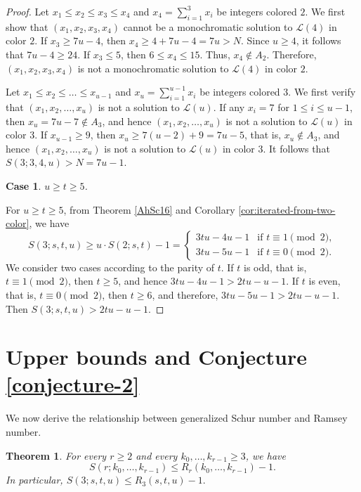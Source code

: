 \documentclass[twoside, 12pt]{article}
\newtheorem{theorem}{Theorem}
\newtheorem{case}{Case}
\begin{document}
\begin{proof}
Let \(x_1 \leq x_2 \leq x_3 \leq x_4\) and $x_4=\sum_{i=1}^3 x_i$ be integers colored \(2\). We first show that \((x_1,x_2,x_3,x_4)\) cannot be a monochromatic solution to \(\mathcal{L}(4)\) in color \(2\). If $x_3 \geq 7u-4$, then $x_4 \geq 4+7u-4=7u >N$.
Since $u \geq 4$, it follows that $7u-4 \geq 24$. If $x_3 \leq 5$, then $ 6 \leq x_4 \leq 15$. Thus, $x_4 \notin A_2$. Therefore, \((x_1,x_2,x_3,x_4)\) is not a monochromatic solution to \(\mathcal{L}(4)\) in color \(2\).


Let \(x_1 \leq x_2 \leq \ldots \leq x_{u-1}\) and $x_u=\sum_{i=1}^{u-1} x_i$ be integers colored \(3\). We first verify that \((x_1,x_2,\ldots, x_u)\) is not a solution to \(\mathcal{L}(u)\).
If any $x_i=7$ for $1 \leq i \leq u-1$,
then $x_u=7u-7 \notin A_3$, and hence \((x_1,x_2,\ldots, x_u)\) is not a solution to \(\mathcal{L}(u)\) in color $3$.
If $x_{u-1} \geq 9$, then $x_u \geq 7(u-2)+9=7u-5$, that is, $x_u \notin A_3$,  and hence \((x_1,x_2,\ldots, x_u)\) is not a solution to \(\mathcal{L}(u)\) in color $3$. It follows that $S(3;3,4,u)>N=7u-1$.




\begin{case}
$u \geq t \geq 5$.
\end{case}

For $u \geq t \geq 5$, from Theorem \ref{AhSc16} and Corollary \ref{cor:iterated-from-two-color}, we have
$$
S(3;s,t,u) \geq u \cdot S(2;s,t)-1
=
\begin{cases}
3tu-4u-1 & \text{if }t \equiv 1 \pmod{2}, \\
3tu-5u-1 & \text{if }t \equiv 0 \pmod{2}.
\end{cases}
$$
We consider two cases according to the parity of \(t\). If \(t\) is odd, that is, \(t \equiv 1 \pmod{2}\), then \(t \geq 5\), and hence $3tu-4u-1 > 2tu-u-1.$
If \(t\) is even, that is, \(t \equiv 0 \pmod{2}\), then \(t \geq 6\), and therefore, $3tu-5u-1 > 2tu-u-1.$ Then $S(3;s,t,u)>2tu-u-1.$
\end{proof}



\section{Upper bounds and Conjecture \ref{conjecture-2}}


We now derive the relationship between generalized Schur number and Ramsey number.

\begin{theorem}\label{th:ramsey-embedding}
For every $r\ge 2$ and every $k_0,\dots,k_{r-1}\ge 3$, we have
\[
S(r;k_0,\dots,k_{r-1})\le R_r(k_0,\dots,k_{r-1})-1.
\]
In particular, $S(3;s,t,u)\le R_3(s,t,u)-1.$
\end{theorem}
\end{document}
